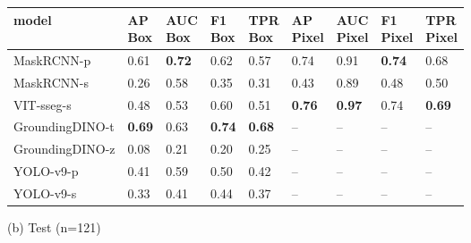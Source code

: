 \documentclass{article}
\begin{document}
\begin{table}[t]
\begin{tabular}{lllllllll}
\hline
 model           & \makecell{AP\\Box}   & \makecell{AUC\\Box}   & \makecell{F1\\Box}   & \makecell{TPR\\Box}   & \makecell{AP\\Pixel}   & \makecell{AUC\\Pixel}   & \makecell{F1\\Pixel}   & \makecell{TPR\\Pixel}   \\
\hline
 MaskRCNN-p      & 0.61                 & \textbf{0.72}         & 0.62                 & 0.57                  & 0.74                   & 0.91                    & \textbf{0.74}          & 0.68                    \\
 MaskRCNN-s      & 0.26                 & 0.58                  & 0.35                 & 0.31                  & 0.43                   & 0.89                    & 0.48                   & 0.50                    \\
 VIT-sseg-s      & 0.48                 & 0.53                  & 0.60                 & 0.51                  & \textbf{0.76}          & \textbf{0.97}           & 0.74                   & \textbf{0.69}           \\
 GroundingDINO-t & \textbf{0.69}        & 0.63                  & \textbf{0.74}        & \textbf{0.68}         & --                     & --                      & --                     & --                      \\
 GroundingDINO-z & 0.08                 & 0.21                  & 0.20                 & 0.25                  & --                     & --                      & --                     & --                      \\
 YOLO-v9-p       & 0.41                 & 0.59                  & 0.50                 & 0.42                  & --                     & --                      & --                     & --                      \\
 YOLO-v9-s       & 0.33                 & 0.41                  & 0.44                 & 0.37                  & --                     & --                      & --                     & --                      \\
\hline
\end{tabular}


(b) Test (n=121)


\end{table}
\end{document}
